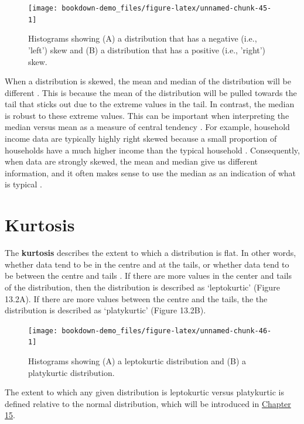 \documentclass[
]{scrbook}
\begin{document}
\begin{figure}
\texttt{[image: bookdown-demo\_files/figure-latex/unnamed-chunk-45-1]} \caption{Histograms showing (A) a distribution that has a negative (i.e., 'left') skew and (B) a distribution that has a positive (i.e., 'right') skew.}\label{fig:unnamed-chunk-45}
\end{figure}

When a distribution is skewed, the mean and median of the distribution will be different \citep{Sokal1995}.
This is because the mean of the distribution will be pulled towards the tail that sticks out due to the extreme values in the tail.
In contrast, the median is robust to these extreme values.
This can be important when interpreting the median versus mean as a measure of central tendency \citep{Reichmann1970}.
For example, household income data are typically highly right skewed because a small proportion of households have a much higher income than the typical household \citep{Mcdonald2013}.
Consequently, when data are strongly skewed, the mean and median give us different information, and it often makes sense to use the median as an indication of what is typical \citep{Chiripanhura2011}.

\hypertarget{kurtosis}{%
\section{Kurtosis}\label{kurtosis}}

The \textbf{kurtosis} describes the extent to which a distribution is flat.
In other words, whether data tend to be in the centre and at the tails, or whether data tend to be between the centre and tails \citep{Sokal1995}.
If there are more values in the center and tails of the distribution, then the distribution is described as `leptokurtic' (Figure 13.2A).
If there are more values between the centre and the tails, the the distribution is described as `platykurtic' (Figure 13.2B).

\begin{figure}
\texttt{[image: bookdown-demo\_files/figure-latex/unnamed-chunk-46-1]} \caption{Histograms showing (A) a leptokurtic distribution and (B) a platykurtic distribution.}\label{fig:unnamed-chunk-46}
\end{figure}

The extent to which any given distribution is leptokurtic versus platykurtic is defined relative to the normal distribution, which will be introduced in \protect\hyperlink{Chapter_15}{Chapter 15}.
\end{document}
